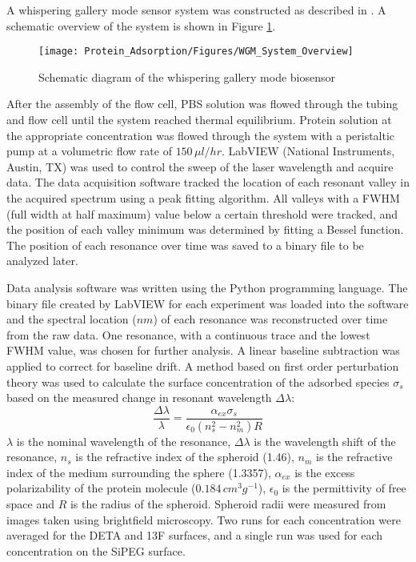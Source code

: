 A whispering gallery mode sensor system was constructed as described
in \cite{Wilson2011,Wilson2009}. A schematic overview of the system
is shown in Figure \ref{fig:WGM System Diagram}.%
\begin{figure}
\texttt{[image: Protein\_Adsorption/Figures/WGM\_System\_Overview]}

\caption{\label{fig:WGM System Diagram}Schematic diagram of the whispering
gallery mode biosensor}


%
\end{figure}
 After the assembly of the flow cell, PBS solution was flowed through
the tubing and flow cell until the system reached thermal equilibrium.
Protein solution at the appropriate concentration was flowed through
the system with a peristaltic pump at a volumetric flow rate of $150\,\mu l/hr$.
LabVIEW (National Instruments, Austin, TX) was used to control the
sweep of the laser wavelength and acquire data. The data acquisition
software tracked the location of each resonant valley in the acquired
spectrum using a peak fitting algorithm. All valleys with a FWHM (full
width at half maximum) value below a certain threshold were tracked,
and the position of each valley minimum was determined by fitting
a Bessel function. The position of each resonance over time was saved
to a binary file to be analyzed later.

Data analysis software was written using the Python programming language.
The binary file created by LabVIEW for each experiment was loaded
into the software and the spectral location ($nm$) of each resonance
was reconstructed over time from the raw data. One resonance, with
a continuous trace and the lowest FWHM value, was chosen for further
analysis. A linear baseline subtraction was applied to correct for
baseline drift. A method based on first order perturbation theory
\cite{Vollmer2002,Arnold2003} was used to calculate the surface concentration
of the adsorbed species $\sigma_{s}$ based on the measured change
in resonant wavelength $\Delta\lambda$:\begin{equation}
\frac{\Delta\lambda}{\lambda}=\frac{\alpha_{ex}\sigma_{s}}{\epsilon_{0}\left(n_{s}^{2}-n_{m}^{2}\right)R}\label{eq:WGM data analysis}\end{equation}
$\lambda$ is the nominal wavelength of the resonance, $\Delta\lambda$
is the wavelength shift of the resonance, $n_{s}$ is the refractive
index of the spheroid (1.46), $n_{m}$ is the refractive index of
the medium surrounding the sphere (1.3357), $\alpha_{ex}$ is the
excess polarizability of the protein molecule ($0.184\, cm^{3}g^{-1}$),
$\epsilon_{0}$ is the permittivity of free space and $R$ is the
radius of the spheroid. Spheroid radii were measured from images taken
using brightfield microscopy. Two runs for each concentration were
averaged for the DETA and 13F surfaces, and a single run was used
for each concentration on the SiPEG surface.



